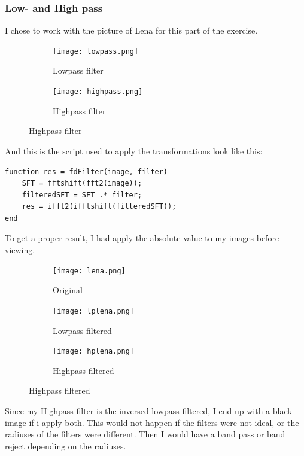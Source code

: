 \documentclass{article}
\begin{document}
\newpage
\subsubsection{Low- and High pass}
I chose to work with the picture of Lena for this part of the exercise. 

\begin{figure}[h]
	\centering
	\caption{The Filters}
	\begin{subfigure}[t]{0.45\textwidth}
		\texttt{[image: lowpass.png]}
		\caption{Lowpass filter}
		\label{fig:lowpass.png}
	\end{subfigure}
	\begin{subfigure}[t]{0.45\textwidth}
		\texttt{[image: highpass.png]}
		\caption{Highpass filter}
		\label{fig:highpass.png}
	\end{subfigure}
\end{figure}

And this is the script used to apply the transformations look like this:
\begin{lstlisting}
function res = fdFilter(image, filter)
    SFT = fftshift(fft2(image));
    filteredSFT = SFT .* filter;
    res = ifft2(ifftshift(filteredSFT));
end
\end{lstlisting}

\newpage
To get a proper result, I had apply the absolute value to my images before viewing.

\begin{figure}[h]
	\caption{The results after filtering}
	\centering
	\begin{subfigure}[t]{0.52\textwidth}
		\texttt{[image: lena.png]}
		\caption{Original}
		\label{fig:lena.png}
	\end{subfigure}
	\begin{subfigure}[b]{0.49\textwidth}
		\texttt{[image: lplena.png]}
		\caption{Lowpass filtered}
		\label{fig:lplena.png}
	\end{subfigure}
	\begin{subfigure}[b]{0.49\textwidth}
		\texttt{[image: hplena.png]}
		\caption{Highpass filtered}
		\label{fig:hplena.png}
	\end{subfigure}
\end{figure}

Since my Highpass filter is the inversed lowpass filtered, I end up with a black image if i apply both. This would not happen if the filters were not ideal, or the radiuses of the filters were different. Then I would have a band pass or band reject depending on the radiuses. 
\end{document}
